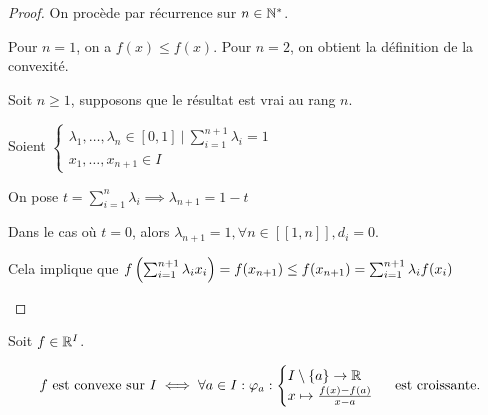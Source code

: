 \documentclass[12pt, a4paper]{report}
\begin{document}
\begin{proof}
    On procède par récurrence sur $n\in\mathbb{N}^*$.

    \begin{outline}
        \1 Pour $n=1$, on a $f(x)\le f(x)$. Pour $n=2$, on obtient la définition de la convexité.

    \1 Soit $n\ge 1$, supposons que le résultat est vrai au rang $n$.

    \2 Soient $\begin{cases}
        \lambda_1,\dots,\lambda_n \in [0,1]~|~\sum_{i=1}^{n+1}\lambda_i=1
        \\
        x_1,\dots,x_{n+1}\in I
    \end{cases}$

    \2 On pose $t=\sum_{i=1}^n \lambda_i \implies \lambda_{n+1} = 1-t$

    \2 Dans le cas où $t=0$, alors $\lambda_{n+1}=1, \forall n \in [\![1,n]\!], d_i=0$.

    \2 Cela implique que $f\left(\sum_{i=1}^{n+1}\lambda_i x_i\right)=f(x_{n+1})\le f(x_{n+1}) = \sum_{i=1}^{n+1} \lambda_i f(x_i)$
    \end{outline}
\end{proof}

\begin{property}
  Soit $f \in \mathbb{R}^I$.

  $$f \text{ est convexe sur } I \iff \forall a \in I : \varphi_a : \begin{cases} I\setminus\{a\}\to\mathbb{R} \\ x\mapsto \frac{f(x)-f(a)}{x-a} \end{cases} \text{ est croissante.}$$
\end{property}
\end{document}
